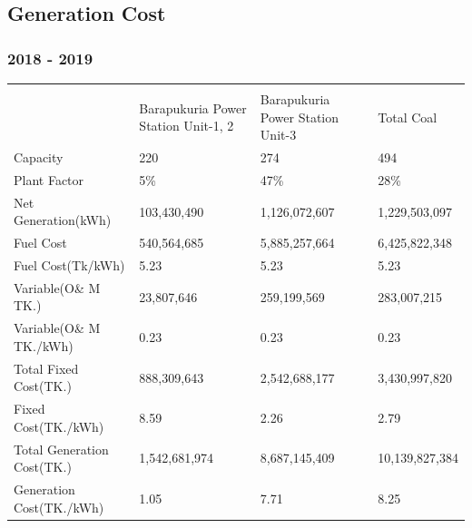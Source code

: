 \documentclass[11 pt]{article}
\begin{document}
\pagebreak

\subsection{Generation Cost}
\subsubsection{2018 - 2019}
	\begin{longtable}{|| m{5.1 em} || m{8 em} || m{7.5 em} || m{5.5 em} ||}
		\hline\hline
		\rowcolor{teal!20}
		\multicolumn{4}{c}{\textbf{\textsf{\textcolor{black}{Generating Plant Under Power Station}}}}\\
		\rowcolor{blue!60}
		\hline\hline
		    \hline
			 & {\footnotesize Barapukuria Power Station Unit-1, 2} & {\footnotesize Barapukuria Power Station Unit-3} & {\footnotesize Total Coal}\\
			\hline
			\footnotesize{Capacity} & 220 & 274 & 494\\
			\footnotesize{Plant Factor} & 5\% & 47\% & 28\%\\
			\footnotesize{Net Generation(kWh)} & 103,430,490 & 1,126,072,607 & {\small 1,229,503,097}\\
			\footnotesize{Fuel Cost} & 540,564,685 & 5,885,257,664 & {\small 6,425,822,348}\\
			\footnotesize{Fuel Cost(Tk/kWh)} & 5.23 & 5.23 & 5.23\\
			\footnotesize{Variable(O\& M TK.)} & 23,807,646 & 259,199,569 & {\small 283,007,215}\\
			\footnotesize{Variable(O\& M TK./kWh)} & 0.23 & 0.23 & 0.23\\
			\footnotesize{Total Fixed Cost(TK.)} & 888,309,643 & 2,542,688,177 & {\small 3,430,997,820}\\
			\tiny{Fixed Cost(TK./kWh)} & 8.59 & 2.26 & 2.79\\
			\footnotesize{Total Generation Cost(TK.)} & 1,542,681,974 & 8,687,145,409 & {\small 10,139,827,384}\\
			\tiny{Generation Cost(TK./kWh)} & 1.05 & 7.71 & 8.25\\
		\hline\hline
	\end{longtable}
\pagebreak
\end{document}
